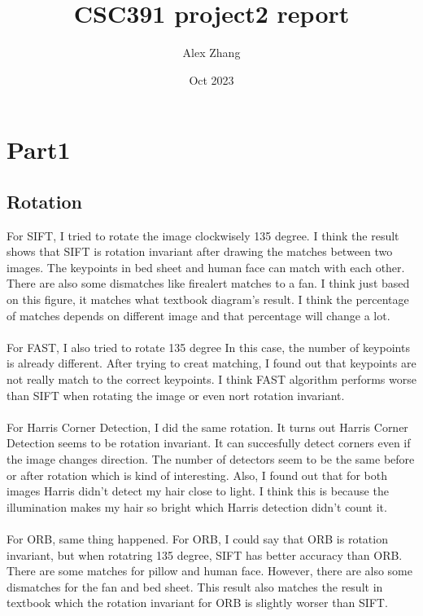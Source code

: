 \documentclass{article}
\title{CSC391 project2 report}
\author{Alex Zhang}
\date{Oct 2023}
\begin{document}
\maketitle
\section*{Part1}
\subsection*{Rotation}
For SIFT, I tried to rotate the image clockwisely 135 degree.
I think the result shows that SIFT is rotation invariant after drawing the matches between two images.
The keypoints in bed sheet and human face can match with each other.
There are also some dismatches like firealert matches to a fan.
I think just based on this figure, it matches what textbook diagram's result.
I think the percentage of matches depends on different image and that percentage will change a lot.\\
\\
For FAST, I also tried to rotate 135 degree
In this case, the number of keypoints is already different.
After trying to creat matching, I found out that keypoints are not really match to the correct keypoints.
I think FAST algorithm performs worse than SIFT when rotating the image or even nort rotation invariant.\\
\\
For Harris Corner Detection, I did the same rotation.
It turns out Harris Corner Detection seems to be rotation invariant.
It can succesfully detect corners even if the image changes direction.
The number of detectors seem to be the same before or after rotation which is kind of interesting.
Also, I found out that for both images Harris didn't detect my hair close to light.
I think this is because the illumination makes my hair so bright which Harris detection didn't count it.\\
\\
For ORB, same thing happened.
For ORB, I could say that ORB is rotation invariant, but when rotatring 135 degree, SIFT has better accuracy than ORB.
There are some matches for pillow and human face.
However, there are also some dismatches for the fan and bed sheet.
This result also matches the result in textbook which the rotation invariant for ORB is slightly worser than SIFT.
\end{document}
